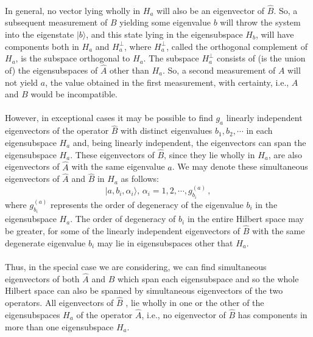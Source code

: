 \paragraph{}
In general, no vector lying wholly in $H_a$ will also be an eigenvector of $\hat{B}$. So, a subsequent measurement of $B$ yielding some
 eigenvalue $b$ will throw the system into the eigenstate $|b\rangle$, and this state lying in the 
eigensubspace $H_b$,  will have components both in $H_a$ and $H_a^{ \bot}$, where $H_a^{ \bot}$, called the orthogonal complement 
of $H_a$, is the subspace orthogonal to $H_a$. The subspace $H_a^{ \bot}$ consists of (is the union of) the eigensubspaces 
of $\hat{A}$ other than $H_a$. So, a second measurement of $A$ will not yield $a$, the value obtained in the first measurement, with certainty, i.e., $A$ and $B$ would be incompatible.


\paragraph{}
However, in exceptional cases it may be possible to find $g_a$ linearly independent eigenvectors of the operator $\hat{B}$
with distinct eigenvalues $b_1, b_2, \cdots$ in each eigensubspace $H_{a}$ and, being  linearly independent, the eigenvectors can span the eigensubspace $H_a$. These eigenvectors of $\hat{B}$, since they lie wholly in 
$H_{a}$, are also eigenvectors of $\hat{A}$ with the same eigenvalue $a$. We may denote these simultaneous eigenvectors
of $\hat{A}$ and $\hat{B}$ in $H_a$ as follows:
\[ |a, b_i, \alpha_i\rangle, \, \alpha_i =1,2, \cdots , g^{(a)}_{b_i} \, , \]
where $g^{(a)}_{b_i}$ represents the order of degeneracy of the eigenvalue $b_i$ in the eigensubspace $H_a$. The order of degeneracy of $b_i$ in the entire Hilbert space may be greater, for some of the linearly independent eigenvectors of $\hat{B}$  with the same degenerate eigenvalue  $b_i$ may lie in eigensubspaces other that $H_a$. 

\paragraph{}
Thus, in the special case we are considering, we can find simultaneous eigenvectors of both $\hat{A}$ and $\hat{B}$ which span each eigensubspace and so the whole Hilbert space can also be spanned by simultaneous eigenvectors of the two operators. All eigenvectors of $\hat{B}$ , lie wholly in one or the other of the eigensubspaces $H_a$ of the operator $\hat{A}$, i.e., no eigenvector of $\hat{B}$
has components in more than one eigensubspace $H_a$.


